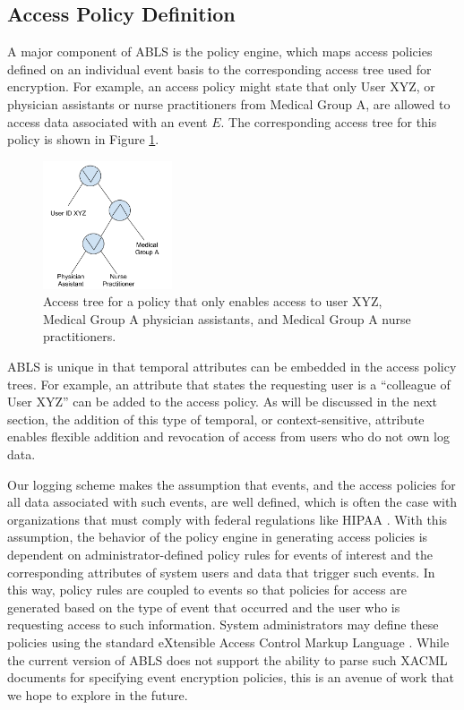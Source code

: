 \documentclass{sig-alternate}
\begin{document}
\subsection{Access Policy Definition}

A major component of ABLS is the policy engine, which maps access policies defined on an individual event basis to 
the corresponding access tree used for encryption. For example, an access policy might state that only User
XYZ, or physician assistants or nurse practitioners from Medical Group A, are allowed to access data associated
with an event $E$. The corresponding access tree for this policy is shown in Figure \ref{fig:accessTree}.  

\begin{figure}[ht!]
\begin{center}
\includegraphics[width=1.5in]{images/cpabePolicy.pdf}
\caption{Access tree for a policy that only enables access to user XYZ, Medical Group A physician assistants, and Medical Group A nurse practitioners.}
\label{fig:accessTree}
\end{center}
\end{figure}

ABLS is unique in that temporal attributes can be embedded in the access policy trees. For example, an attribute
that states the requesting user is a ``colleague of User XYZ'' can be added to the access policy. As will be discussed 
in the next section, the addition of this type of temporal, or context-sensitive, attribute enables flexible addition and 
revocation of access from users who do not own log data. 

Our logging scheme makes the assumption that events, and the access policies for all data associated
with such events, are well defined, which is often the case with organizations that must
comply with federal regulations like HIPAA \cite{annas2003hipaa}. With this
assumption, the behavior of the policy engine in generating access policies is dependent on
administrator-defined policy rules for events of interest and the corresponding attributes of
system users and data that trigger such events. In this way, policy rules are coupled to events so that 
policies for access are generated based on the type of event that occurred and the user who is requesting 
access to such information. System administrators may define these policies using the standard eXtensible
Access Control Markup Language \cite{anderson2005comparison}. While the current version of ABLS does not
support the ability to parse such XACML documents for specifying event encryption policies, this is an avenue of
work that we hope to explore in the future.
\end{document}
